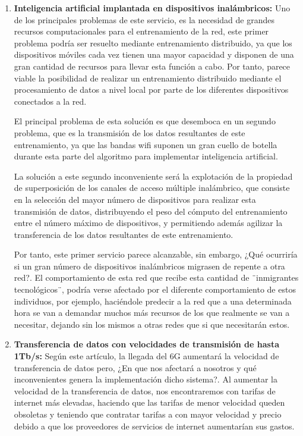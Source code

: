 \begin{enumerate}
\item {\bfseries Inteligencia artificial implantada en dispositivos inalámbricos:  }
Uno de los principales problemas de este servicio, es la necesidad de grandes recursos computacionales para el entrenamiento de la red, este primer problema podría ser resuelto mediante entrenamiento distribuido, ya que los dispositivos móviles cada vez tienen una mayor capacidad y disponen de una gran cantidad de recursos para llevar esta función a cabo. Por tanto, parece viable la posibilidad de realizar un entrenamiento distribuido mediante el procesamiento de datos a nivel local por parte de los diferentes dispositivos conectados a la red.

El principal problema de esta solución es que desemboca en un segundo problema, que es la transmisión de los datos resultantes de este entrenamiento, ya que las bandas wifi suponen un gran cuello de botella durante esta parte del algoritmo para implementar inteligencia artificial. 

La solución a este segundo inconveniente será la explotación de la propiedad de superposición de los canales de acceso múltiple inalámbrico, que consiste en la selección del mayor número de dispositivos para realizar esta transmisión de datos, distribuyendo el peso del cómputo del entrenamiento entre el número máximo de dispositivos, y permitiendo además agilizar la transferencia de los datos resultantes de este entrenamiento.

Por tanto, este primer servicio parece alcanzable, sin embargo, ¿Qué ocurriría si un gran número de dispositivos inalámbricos migrasen de repente a otra red?. El comportamiento de esta red que recibe esta cantidad de ¨inmigrantes tecnológicos¨, podría verse afectado por el diferente comportamiento de estos individuos, por ejemplo, haciéndole predecir a la red que a una determinada hora se van a demandar muchos más recursos de los que realmente se van a necesitar, dejando sin los mismos a otras redes que si que necesitarán estos.

\item {\bfseries Transferencia de datos con velocidades de transmisión de hasta 1Tb/s:  }
Según este artículo, la llegada del 6G aumentará la velocidad de transferencia de datos pero, ¿En que nos afectará a nosotros y qué inconvenientes genera la implementación dicho sistema?. Al aumentar la velocidad de la transferencia de datos, nos encontraremos con tarifas de internet más elevadas, haciendo que las tarifas de menor velocidad queden obsoletas y teniendo que contratar tarifas a con mayor velocidad y precio debido a que los proveedores de servicios de internet aumentarían sus gastos.


\end{enumerate}
